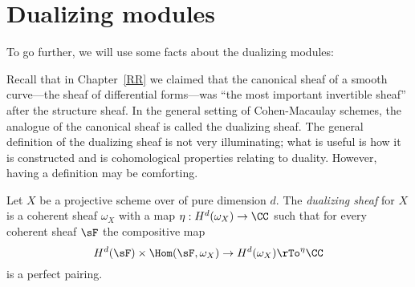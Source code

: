 \section{Dualizing modules}\label{duality}

To go further, we will use some facts about the dualizing modules:

Recall that in Chapter~\ref{RR} we claimed that the canonical sheaf of a smooth curve---the sheaf of differential forms---was ``the most important invertible sheaf'' after the structure sheaf. In the general setting of Cohen-Macaulay schemes, the analogue of the canonical sheaf is called the dualizing sheaf.
The general definition of the dualizing sheaf is not very illuminating; what is useful is how it is constructed and is cohomological properties relating to duality.
However, having a definition may be comforting. 

\begin{definition}
Let $X$ be a projective scheme over of pure dimension $d$. The \emph{dualizing sheaf} for $X$ is a coherent sheaf $\omega_X$ 
with a map $\eta: H^d(\omega_X) \to \CC$ such that for every coherent sheaf  $\sF$ the compositive map
$$
H^d(\sF) \times \Hom(\sF, \omega_X) \to H^d(\omega_X) \rTo^\eta \CC
$$
is a perfect pairing. 
\end{definition}


